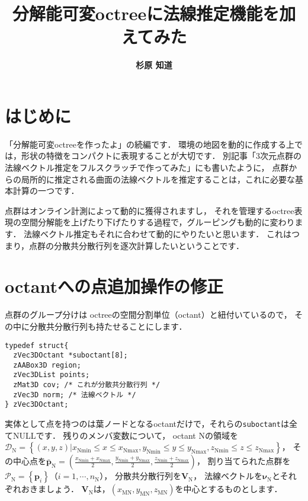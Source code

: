 ﻿\documentclass[a4paper]{jsarticle}
\title{\bf 分解能可変octreeに法線推定機能を加えてみた}
\author{\Large{\bf 杉原 知道}}
\date{}
\begin{document}
\maketitle
\vspace{-\baselineskip}

\section{はじめに}

「分解能可変octreeを作ったよ」の続編です．
環境の地図を動的に作成する上では，形状の特徴をコンパクトに表現することが大切です．
別記事「3次元点群の法線ベクトル推定をフルスクラッチで作ってみた」にも書いたように，
点群からの局所的に推定される曲面の法線ベクトルを推定することは，これに必要な基本計算の一つです．

点群はオンライン計測によって動的に獲得されますし，
それを管理するoctree表現の空間分解能を上げたり下げたりする過程で，グルーピングも動的に変わります．
法線ベクトル推定もそれに合わせて動的にやりたいと思います．
これはつまり，点群の分散共分散行列を逐次計算したいということです．


\section{octantへの点追加操作の修正}

点群のグループ分けは
octreeの空間分割単位（octant）と紐付いているので，
その中に分散共分散行列も持たせることにします．
\begin{screen}
\begin{verbatim}
typedef struct{
  zVec3DOctant *suboctant[8];
  zAABox3D region;
  zVec3DList points;
  zMat3D cov; /* これが分散共分散行列 */
  zVec3D norm; /* 法線ベクトル */
} zVec3DOctant;
\end{verbatim}
\end{screen}

実体として点を持つのは葉ノードとなるoctantだけで，それらの\verb|suboctant|は全てNULLです．
残りのメンバ変数について，
octant Nの領域を$\mathcal{D}_{\mathrm{N}}=\left\{(x,y,z)|x_{\mathrm{Nmin}}\leq x\leq x_{\mathrm{Nmax}},y_{\mathrm{Nmin}}\leq y\leq y_{\mathrm{Nmax}},z_{\mathrm{Nmin}}\leq z\leq z_{\mathrm{Nmax}}\right\}$，
その中心点を$\bar{\bm{p}}_{\mathrm{N}}=\left(\frac{x_{\mathrm{Nmin}}+x_{\mathrm{Nmax}}}{2},\frac{y_{\mathrm{Nmin}}+y_{\mathrm{Nmax}}}{2},\frac{z_{\mathrm{Nmin}}+z_{\mathrm{Nmax}}}{2}\right)$，
割り当てられた点群を$\mathcal{P}_{\mathrm{N}}=\left\{\bm{p}_{i}\right\}$（$i=1,\cdots,n_{\mathrm{N}}$），
分散共分散行列を$\bm{V}_{\mathrm{N}}$，
法線ベクトルを$\bm{\nu}_{\mathrm{N}}$とそれぞれおきましょう．
$\bm{V}_{\mathrm{N}}$は，$(x_{\mathrm{MN}},y_{\mathrm{MN}},z_{\mathrm{MN}})$を中心とするものとします．
\end{document}
